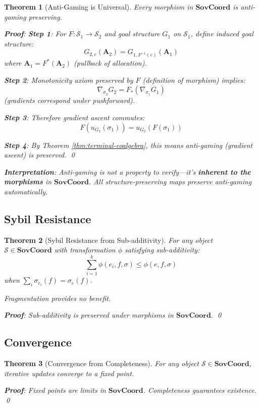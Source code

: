 \documentclass[11pt,a4paper]{article}
\newtheorem{theorem}{Theorem}[section]
\theoremstyle{definition}
\theoremstyle{remark}
\newcommand{\SovCoord}{\mathbf{SovCoord}}
\begin{document}
\begin{theorem}[Anti-Gaming is Universal]
\label{thm:anti-gaming-cat}
Every morphism in $\SovCoord$ is anti-gaming preserving.

\textbf{Proof}: 
\textbf{Step 1}: For $F: \mathcal{S}_1 \to \mathcal{S}_2$ and goal structure $G_1$ on $\mathcal{S}_1$, define induced goal structure:
\[ G_{2,e}(\mathbf{A}_2) = G_{1,F^{-1}(e)}(\mathbf{A}_1) \]
where $\mathbf{A}_1 = F^*(\mathbf{A}_2)$ (pullback of allocation).

\textbf{Step 2}: Monotonicity axiom preserved by $F$ (definition of morphism) implies:
\[ \nabla_{\sigma_2} G_2 = F_*(\nabla_{\sigma_1} G_1) \]
(gradients correspond under pushforward).

\textbf{Step 3}: Therefore gradient ascent commutes:
\[ F(u_{G_1}(\sigma_1)) = u_{G_2}(F(\sigma_1)) \]

\textbf{Step 4}: By Theorem \ref{thm:terminal-coalgebra}, this means anti-gaming (gradient ascent) is preserved. \qed

\textbf{Interpretation}: Anti-gaming is not a property to verify—it's \textbf{inherent to the morphisms} in $\SovCoord$. All structure-preserving maps preserve anti-gaming automatically.
\end{theorem}

\subsection{Sybil Resistance}

\begin{theorem}[Sybil Resistance from Sub-additivity]
For any object $\mathcal{S} \in \SovCoord$ with transformation $\phi$ satisfying sub-additivity:
\[ \sum_{i=1}^k \phi(e_i, f, \sigma) \le \phi(e, f, \sigma) \]
when $\sum_i \sigma_{e_i}(f) = \sigma_e(f)$.

Fragmentation provides no benefit.

\textbf{Proof}: Sub-additivity is preserved under morphisms in $\SovCoord$. \qed
\end{theorem}

\subsection{Convergence}

\begin{theorem}[Convergence from Completeness]
For any object $\mathcal{S} \in \SovCoord$, iterative updates converge to a fixed point.

\textbf{Proof}: Fixed points are limits in $\SovCoord$. Completeness guarantees existence. \qed
\end{theorem}
\end{document}
